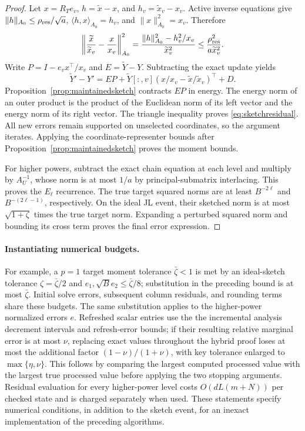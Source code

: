 \begin{proof}
Let $x=R_Te_v$, $h=\widetilde x-x$, and $h_v=\widetilde x_v-x_v$.
Active inverse equations give
$\|h\|_{A_0}\leq\rho_{\rm res}/\sqrt a$,
$\langle h,x\rangle_{A_0}=h_v$, and
$\|x\|_{A_0}^2=x_v$. Therefore
\[
 \left\|\frac{\widetilde x}{\widetilde x_v}
              -\frac{x}{x_v}\right\|_{A_0}^2
 =\frac{\|h\|_{A_0}^2-h_v^2/x_v}{\widetilde x_v^2}
 \leq\frac{\rho_{\rm res}^2}{a\widetilde x_v^2}.
\]
Write $P=I-e_vx^\top/x_v$ and $E=\widetilde Y-Y$.
Subtracting the exact update yields
\[
 \widetilde Y'-Y'=EP+
 \widetilde Y[:,v]\left(x/x_v-\widetilde x/\widetilde x_v\right)^\top+D.
\]
Proposition~\ref{prop:maintainedsketch} contracts $EP$ in energy.
The energy norm of an outer product is the product of the
Euclidean norm of its left vector and the energy norm of its
right vector. The triangle inequality proves
\eqref{eq:sketchresidual}. All new errors remain supported on
unselected coordinates, so the argument iterates. Applying the
coordinate-representer bounds after
Proposition~\ref{prop:maintainedsketch} proves the moment bounds.

For higher powers, subtract the exact chain equation at each
level and multiply by $A_U^{-1}$, whose norm is at most $1/a$
by principal-submatrix interlacing. This proves the $E_\ell$
recurrence. The true target squared norms are at least
$B^{-2\ell}$ and $B^{-(2\ell-1)}$, respectively. On the ideal
JL event, their sketched norm is at most $\sqrt{1+\zeta}$
times the true target norm. Expanding a perturbed squared norm
and bounding its cross term proves the final error expression.
\end{proof}

\paragraph{Instantiating numerical budgets.}
For example, a $p=1$ target moment tolerance $\bar\zeta<1$
is met by an ideal-sketch tolerance $\zeta=\bar\zeta/2$ and
$e_1,\sqrt B e_2\leq\bar\zeta/8$; substitution in the preceding
bound is at most $\bar\zeta$. Initial solve errors, subsequent
column residuals, and rounding terms share these budgets.
The same substitution applies to the higher-power normalized
errors $e$. Refreshed scalar entries use the the incremental analysis decrement
intervals and refresh-error bounds; if their resulting relative
marginal error is at most $\nu$, replacing exact values throughout
the hybrid proof loses at most the additional factor
$(1-\nu)/(1+\nu)$, with key tolerance enlarged to
$\max\{\eta,\nu\}$. This follows by comparing the largest
computed processed value with the largest true processed value
before applying the two stopping arguments. Residual evaluation
for every higher-power level costs $O(dL(m+N))$ per checked
state and is charged separately when used. These statements
specify numerical conditions, in addition to the sketch event,
for an inexact implementation of the preceding algorithms.

